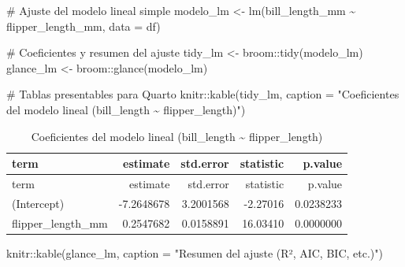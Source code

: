 \documentclass[
  spanish,
  11pt,
  a4paper,
  DIV=11,
  numbers=noendperiod]{scrartcl}
\newenvironment{Shaded}{\begin{snugshade}}{\end{snugshade}}
\newcommand{\AttributeTok}[1]{\textcolor[rgb]{0.40,0.45,0.13}{#1}}
\newcommand{\CommentTok}[1]{\textcolor[rgb]{0.37,0.37,0.37}{#1}}
\newcommand{\FunctionTok}[1]{\textcolor[rgb]{0.28,0.35,0.67}{#1}}
\newcommand{\NormalTok}[1]{\textcolor[rgb]{0.00,0.23,0.31}{#1}}
\newcommand{\OtherTok}[1]{\textcolor[rgb]{0.00,0.23,0.31}{#1}}
\newcommand{\SpecialCharTok}[1]{\textcolor[rgb]{0.37,0.37,0.37}{#1}}
\newcommand{\StringTok}[1]{\textcolor[rgb]{0.13,0.47,0.30}{#1}}
\begin{document}
\begin{Shaded}
\begin{Highlighting}[numbers=left,,]
\CommentTok{\# Ajuste del modelo lineal simple}
\NormalTok{modelo\_lm }\OtherTok{\textless{}{-}} \FunctionTok{lm}\NormalTok{(bill\_length\_mm }\SpecialCharTok{\textasciitilde{}}\NormalTok{ flipper\_length\_mm, }\AttributeTok{data =}\NormalTok{ df)}

\CommentTok{\# Coeficientes y resumen del ajuste}
\NormalTok{tidy\_lm }\OtherTok{\textless{}{-}}\NormalTok{ broom}\SpecialCharTok{::}\FunctionTok{tidy}\NormalTok{(modelo\_lm)}
\NormalTok{glance\_lm }\OtherTok{\textless{}{-}}\NormalTok{ broom}\SpecialCharTok{::}\FunctionTok{glance}\NormalTok{(modelo\_lm)}

\CommentTok{\# Tablas presentables para Quarto}
\NormalTok{knitr}\SpecialCharTok{::}\FunctionTok{kable}\NormalTok{(tidy\_lm, }\AttributeTok{caption =} \StringTok{"Coeficientes del modelo lineal }
\StringTok{             (bill\_length \textasciitilde{} flipper\_length)"}\NormalTok{)}
\end{Highlighting}
\end{Shaded}

\begin{longtable}[]{@{}lrrrr@{}}
\caption{Coeficientes del modelo lineal (bill\_length \textasciitilde{}
flipper\_length)}\tabularnewline
\toprule\noalign{}
term & estimate & std.error & statistic & p.value \\
\midrule\noalign{}
\endfirsthead
\toprule\noalign{}
term & estimate & std.error & statistic & p.value \\
\midrule\noalign{}
\endhead
\bottomrule\noalign{}
\endlastfoot
(Intercept) & -7.2648678 & 3.2001568 & -2.27016 & 0.0238233 \\
flipper\_length\_mm & 0.2547682 & 0.0158891 & 16.03410 & 0.0000000 \\
\end{longtable}

\begin{Shaded}
\begin{Highlighting}[numbers=left,,]
\NormalTok{knitr}\SpecialCharTok{::}\FunctionTok{kable}\NormalTok{(glance\_lm, }\AttributeTok{caption =} \StringTok{"Resumen del ajuste (R², AIC, BIC, etc.)"}\NormalTok{)}
\end{Highlighting}
\end{Shaded}
\end{document}
